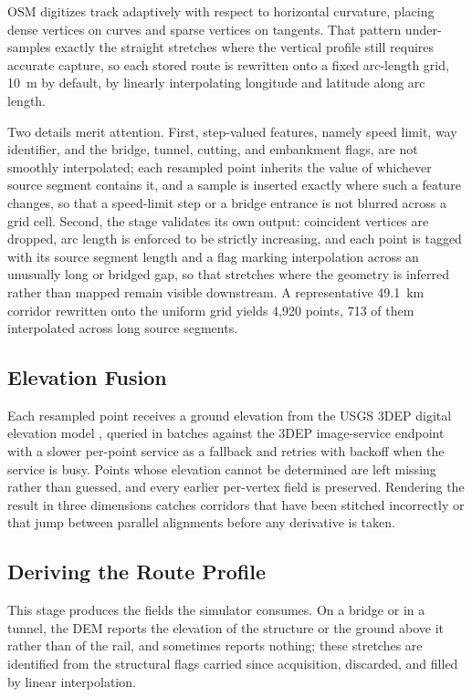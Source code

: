 \documentclass[numbered]{trbunofficial}
\begin{document}
OSM digitizes track adaptively with respect to horizontal curvature, placing dense vertices on curves and sparse vertices on tangents. That pattern under-samples exactly the straight stretches where the vertical profile still requires accurate capture, so each stored route is rewritten onto a fixed arc-length grid, 10~m by default, by linearly interpolating longitude and latitude along arc length.

Two details merit attention. First, step-valued features, namely speed limit, way identifier, and the bridge, tunnel, cutting, and embankment flags, are not smoothly interpolated; each resampled point inherits the value of whichever source segment contains it, and a sample is inserted exactly where such a feature changes, so that a speed-limit step or a bridge entrance is not blurred across a grid cell. Second, the stage validates its own output: coincident vertices are dropped, arc length is enforced to be strictly increasing, and each point is tagged with its source segment length and a flag marking interpolation across an unusually long or bridged gap, so that stretches where the geometry is inferred rather than mapped remain visible downstream. A representative 49.1~km corridor rewritten onto the uniform grid yields 4,920 points, 713 of them interpolated across long source segments.

\subsection{Elevation Fusion}

Each resampled point receives a ground elevation from the USGS 3DEP digital elevation model \citep{usgs3dep}, queried in batches against the 3DEP image-service endpoint with a slower per-point service as a fallback and retries with backoff when the service is busy. Points whose elevation cannot be determined are left missing rather than guessed, and every earlier per-vertex field is preserved. Rendering the result in three dimensions catches corridors that have been stitched incorrectly or that jump between parallel alignments before any derivative is taken.

\subsection{Deriving the Route Profile}

This stage produces the fields the simulator consumes. On a bridge or in a tunnel, the DEM reports the elevation of the structure or the ground above it rather than of the rail, and sometimes reports nothing; these stretches are identified from the structural flags carried since acquisition, discarded, and filled by linear interpolation.
\end{document}
